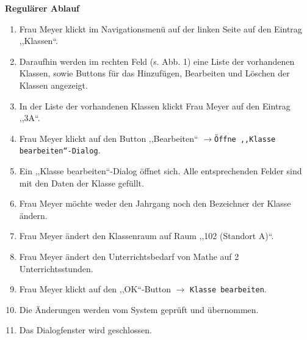 \documentclass[fontsize=12pt,paper=a4,twoside]{scrartcl}
\begin{document}
\textbf{Regulärer Ablauf}
\begin{enumerate}
\item Frau Meyer klickt im Navigationsmenü auf der linken Seite auf den Eintrag ,,Klassen``.
\item Daraufhin werden im rechten Feld (s. Abb. 1) eine Liste der vorhandenen Klassen, sowie Buttons für das Hinzufügen, Bearbeiten und Löschen der Klassen angezeigt.
\item In der Liste der vorhandenen Klassen klickt Frau Meyer auf den Eintrag ,,3A``.
\item Frau Meyer klickt auf den Button ,,Bearbeiten`` $\rightarrow$\texttt{Öffne ,,Klasse bearbeiten``-Dialog}.
\item Ein ,,Klasse bearbeiten``-Dialog öffnet sich. Alle entsprechenden Felder sind mit den Daten der Klasse gefüllt.
\item Frau Meyer möchte weder den Jahrgang noch den Bezeichner der Klasse ändern.
\item Frau Meyer ändert den Klassenraum auf Raum ,,102 (Standort A)``.
\item Frau Meyer ändert den Unterrichtsbedarf von Mathe auf 2 Unterrichtsstunden.
\item Frau Meyer klickt auf den ,,OK``-Button $\rightarrow$ \texttt{Klasse bearbeiten}.
\item Die Änderungen werden vom System geprüft und übernommen.
\item Das Dialogfenster wird geschlossen.
\end{enumerate}
\vspace{5pt}
\end{document}
